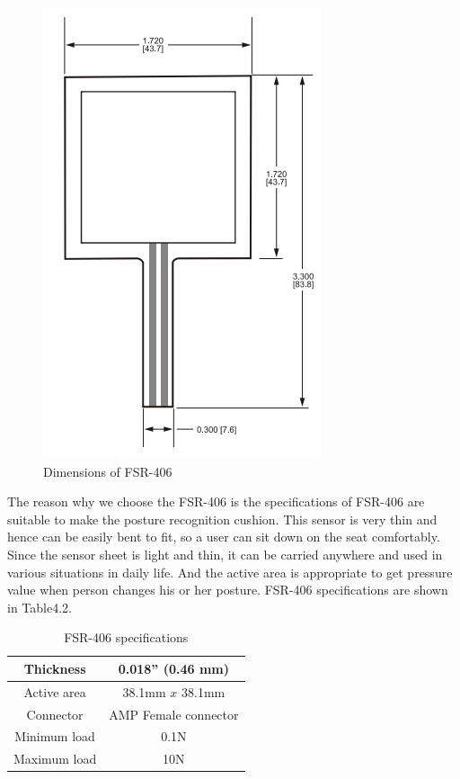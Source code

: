 \documentclass[conference]{IEEEtran}
\begin{document}
\begin{figure}[H]
\begin{center}
    \includegraphics[scale=0.6]{img_06.png}
    \caption{Dimensions of FSR-406} 
\end{center}
\end{figure}

The reason why we choose the FSR-406 is the specifications of FSR-406 are suitable to make the posture recognition cushion. This sensor is very thin and hence can be easily bent to fit, so a user can sit down on the seat comfortably. Since the sensor sheet is light and thin, it can be carried anywhere and used in various situations in daily life. And the active area is appropriate to get pressure value when person changes his or her posture. FSR-406 specifications are shown in Table4.2.

 \begin{table}[h]
{\renewcommand\arraystretch{1.25}
\caption{FSR-406 specifications}
\begin{tabular}{|c|cc}  \hline\hline
Thickness& \multicolumn{2}{p{6cm}|}{\raggedright 0.018'' (0.46 mm)} \\ \hline
Active area& \multicolumn{2}{p{6cm}|}{\raggedright 38.1mm $x$ 38.1mm} \\ \hline
Connector& \multicolumn{2}{p{6cm}|}{\raggedright AMP Female connector} \\ \hline
Minimum load& \multicolumn{2}{p{6cm}|}{\raggedright 0.1N} \\ \hline
Maximum load& \multicolumn{2}{p{6cm}|}{\raggedright 10N} \\ \hline \hline
\end{tabular}}
\end{table}
\end{document}
